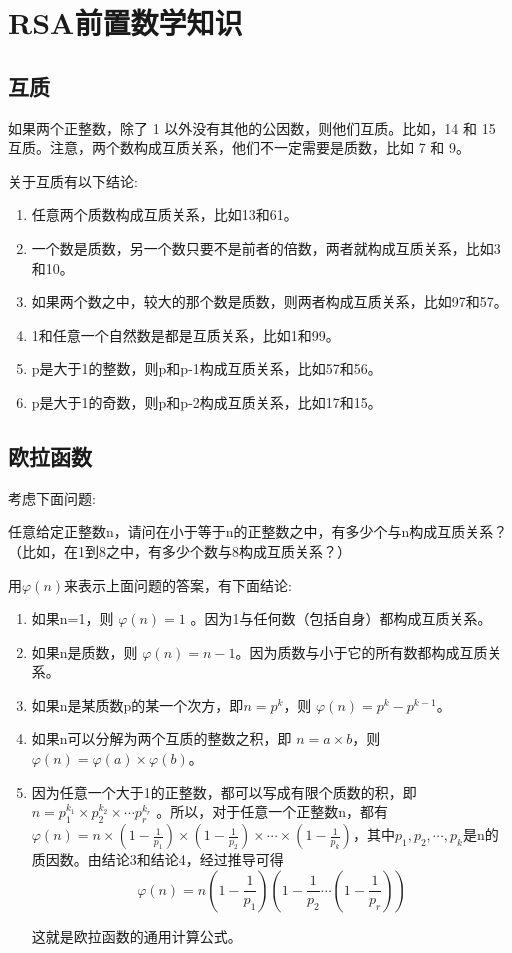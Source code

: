\chapter{RSA前置数学知识}

\section{互质}

如果两个正整数，除了 1 以外没有其他的公因数，则他们互质。比如，14 和 15 互质。注意，两个数构成互质关系，他们不一定需要是质数，比如 7 和 9。

关于互质有以下结论:
\begin{enumerate}
    \item 任意两个质数构成互质关系，比如13和61。
    \item 一个数是质数，另一个数只要不是前者的倍数，两者就构成互质关系，比如3和10。
    \item 如果两个数之中，较大的那个数是质数，则两者构成互质关系，比如97和57。
    \item 1和任意一个自然数是都是互质关系，比如1和99。
    \item p是大于1的整数，则p和p-1构成互质关系，比如57和56。
    \item p是大于1的奇数，则p和p-2构成互质关系，比如17和15。
\end{enumerate}

\section{欧拉函数}

考虑下面问题:

任意给定正整数n，请问在小于等于n的正整数之中，有多少个与n构成互质关系？（比如，在1到8之中，有多少个数与8构成互质关系？）

用$\varphi (n)$来表示上面问题的答案，有下面结论:

\begin{enumerate}
    \item 如果n=1，则 $\varphi(n) = 1$ 。因为1与任何数（包括自身）都构成互质关系。
    \item 如果n是质数，则 $\varphi(n) = n-1 $。因为质数与小于它的所有数都构成互质关系。
    \item 如果n是某质数p的某一个次方，即$n=p^k$，则 $\varphi(n) = p^k - p^{k-1}$。
    \item 如果n可以分解为两个互质的整数之积，即 $ n=a\times b $，则$\varphi(n) = \varphi(a) \times \varphi(b)$。
    \item 因为任意一个大于1的正整数，都可以写成有限个质数的积，即$ n = p_1^{k_1} \times p_2^{k_2} \times \cdots p_r^{k_r} $ 。所以，对于任意一个正整数n，都有$\varphi(n) = n \times (1-\frac{1}{p_1}) \times (1-\frac{1}{p_2}) \times \cdots \times (1-\frac{1}{p_k})$，其中$p_1,p_2,\cdots,p_k$是n的质因数。由结论3和结论4，经过推导可得$$ \varphi(n) = n(1-\frac{1}{p_1})(1-\frac{1}{p_2}\cdots(1-\frac{1}{p_r}))$$

          这就是欧拉函数的通用计算公式。
\end{enumerate}

